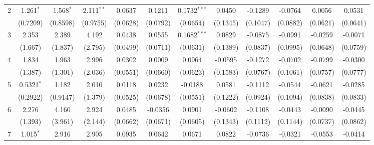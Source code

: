 \begin{table}[htbp]
\begin{tabular}{lccccccccccc}
      2                    & 1.261$^{*}$  & 1.568$^{*}$   & 2.111$^{**}$ & 0.0637         & 0.1211         & 0.1732$^{***}$ & 0.0450                   & -0.1289        & -0.0764        & 0.0056           & 0.0531\\   
                           & (0.7209)     & (0.8598)      & (0.9755)     & (0.0628)       & (0.0792)       & (0.0654)       & (0.1345)                 & (0.1047)       & (0.0882)       & (0.0621)         & (0.0641)\\   
      3                    & 2.353        & 2.389         & 4.192        & 0.0438         & 0.0555         & 0.1682$^{***}$ & 0.0829                   & -0.0875        & -0.0991        & -0.0259          & -0.0071\\   
                           & (1.667)      & (1.837)       & (2.795)      & (0.0499)       & (0.0711)       & (0.0631)       & (0.1389)                 & (0.0837)       & (0.0995)       & (0.0648)         & (0.0759)\\   
      4                    & 1.834        & 1.963         & 2.996        & 0.0302         & 0.0009         & 0.0964         & -0.0595                  & -0.1272        & -0.0702        & -0.0799          & -0.0300\\   
                           & (1.387)      & (1.301)       & (2.036)      & (0.0551)       & (0.0660)       & (0.0623)       & (0.1583)                 & (0.0767)       & (0.1061)       & (0.0757)         & (0.0777)\\   
      5                    & 0.5321$^{*}$ & 1.182         & 2.010        & 0.0118         & 0.0232         & -0.0188        & 0.0581                   & -0.1112        & -0.0544        & -0.0621          & -0.0285\\   
                           & (0.2922)     & (0.9147)      & (1.379)      & (0.0525)       & (0.0678)       & (0.0551)       & (0.1222)                 & (0.0924)       & (0.1094)       & (0.0838)         & (0.0833)\\   
      6                    & 2.276        & 4.160         & 2.924        & 0.0485         & -0.0356        & 0.0901         & -0.0602                  & -0.1108        & -0.0443        & -0.0090          & -0.0445\\   
                           & (1.393)      & (3.961)       & (2.144)      & (0.0662)       & (0.0671)       & (0.0605)       & (0.1343)                 & (0.1112)       & (0.1144)       & (0.0737)         & (0.0862)\\   
      7                    & 1.015$^{*}$  & 2.916         & 2.905        & 0.0935         & 0.0642         & 0.0671         & 0.0822                   & -0.0736        & -0.0321        & -0.0553          & -0.0414\\   

\end{tabular}
\end{table}
